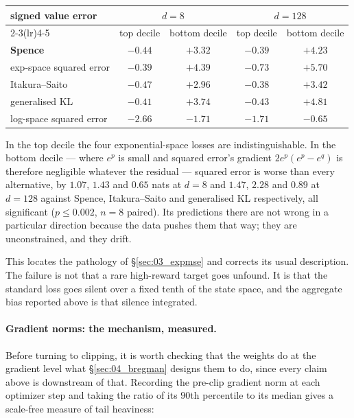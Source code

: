 \begin{center}\small
\begin{tabular}{lcccc}
\toprule
signed value error & \multicolumn{2}{c}{$d=8$} & \multicolumn{2}{c}{$d=128$}\\
\cmidrule(lr){2-3}\cmidrule(lr){4-5}
 & top decile & bottom decile & top decile & bottom decile\\
\midrule
\textbf{Spence}          & $-0.44$ & $+3.32$ & $-0.39$ & $+4.23$\\
exp-space squared error  & $-0.39$ & $\mathbf{+4.39}$ & $-0.73$ & $\mathbf{+5.70}$\\
Itakura--Saito           & $-0.47$ & $+2.96$ & $-0.38$ & $+3.42$\\
generalised KL           & $-0.41$ & $+3.74$ & $-0.43$ & $+4.81$\\
log-space squared error  & $-2.66$ & $-1.71$ & $-1.71$ & $-0.65$\\
\bottomrule
\end{tabular}
\end{center}

In the top decile the four exponential-space losses are indistinguishable. In
the bottom decile --- where $e^{p}$ is small and squared error's gradient
$2e^{p}(e^{p}-e^{q})$ is therefore negligible whatever the residual --- squared
error is worse than every alternative, by $1.07$, $1.43$ and $0.65$ nats at
$d=8$ and $1.47$, $2.28$ and $0.89$ at $d=128$ against Spence, Itakura--Saito
and generalised KL respectively, all significant ($p\le0.002$, $n=8$ paired).
Its predictions there are not wrong in a particular direction because the data
pushes them that way; they are unconstrained, and they drift.

This locates the pathology of \S\ref{sec:03_expmse} and corrects its usual
description. The failure is not that a rare high-reward target goes unfound. It
is that the standard loss goes silent over a fixed tenth of the state space,
and the aggregate bias reported above is that silence integrated.

\paragraph{Gradient norms: the mechanism, measured.}
\label{par:gradnorms}
Before turning to clipping, it is worth checking that the weights do at the
gradient level what \S\ref{sec:04_bregman} designs them to do, since every
claim above is downstream of that. Recording the pre-clip gradient norm at each
optimizer step and taking the ratio of its $90$th percentile to its median
gives a scale-free measure of tail heaviness:


